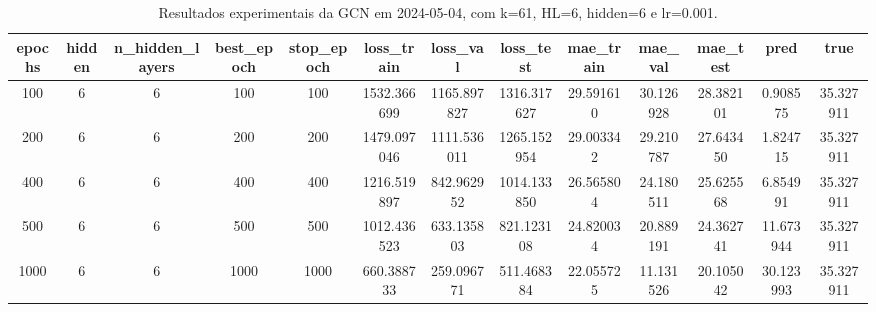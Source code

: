 \begin{table}[h]
\centering
\caption{Resultados experimentais da GCN em 2024-05-04, com k=61, HL=6, hidden=6 e lr=0.001.}
\label{tab:gcn_results_k61_hl6_h6_d20240504}
\begin{tabular}{ccccccccccccc}
\toprule
epochs & hidden & n\_hidden\_layers & best\_epoch & stop\_epoch & loss\_train & loss\_val & loss\_test & mae\_train & mae\_val & mae\_test & pred & true \\
\midrule
100 & 6 & 6 & 100 & 100 & 1532.366699 & 1165.897827 & 1316.317627 & 29.591610 & 30.126928 & 28.382101 & 0.908575 & 35.327911 \\
200 & 6 & 6 & 200 & 200 & 1479.097046 & 1111.536011 & 1265.152954 & 29.003342 & 29.210787 & 27.643450 & 1.824715 & 35.327911 \\
400 & 6 & 6 & 400 & 400 & 1216.519897 & 842.962952 & 1014.133850 & 26.565804 & 24.180511 & 25.625568 & 6.854991 & 35.327911 \\
500 & 6 & 6 & 500 & 500 & 1012.436523 & 633.135803 & 821.123108 & 24.820034 & 20.889191 & 24.362741 & 11.673944 & 35.327911 \\
1000 & 6 & 6 & 1000 & 1000 & 660.388733 & 259.096771 & 511.468384 & 22.055725 & 11.131526 & 20.105042 & 30.123993 & 35.327911 \\
\bottomrule
\end{tabular}
\end{table}
